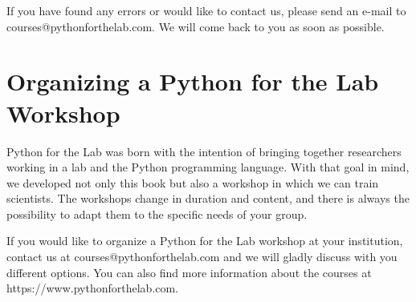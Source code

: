 If you have found any errors or would like to contact us, please send an e-mail to courses@pythonforthelab.com. We will come back to you as soon as possible. 

\section{Organizing a Python for the Lab Workshop}
Python for the Lab was born with the intention of bringing together researchers working in a lab and the Python programming language. With that goal in mind, we developed not only this book but also a workshop in which we can train scientists. The workshops change in duration and content, and there is always the possibility to adapt them to the specific needs of your group. 

If you would like to organize a Python for the Lab workshop at your institution, contact us at courses@pythonforthelab.com and we will gladly discuss with you different options. You can also find more information about the courses at https://www.pythonforthelab.com.
